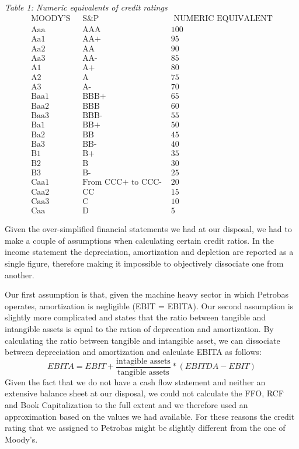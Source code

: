 \documentclass[
]{article}
\begin{document}
\emph{Table 1: Numeric equivalents of credit ratings} \[
\begin{array}{ccc}
\text { MOODY'S } & \text { S\&P } & \text { NUMERIC EQUIVALENT } \\
\hline \text { Aaa } & \text { AAA } & 100 \\
\text { Aa1 } & \text { AA+ } & 95 \\
\text { Aa2 } & \text { AA } & 90 \\
\text { Aa3 } & \text { AA- } & 85 \\
\text { A1 } & \text { A+ } & 80 \\
\text { A2 } & \text { A } & 75 \\
\text { A3 } & \text { A- } & 70 \\
\text { Baa1 } & \text { BBB+ } & 65 \\
\text { Baa2 } & \text { BBB } & 60 \\
\text { Baa3 } & \text { BBB- } & 55 \\
\text { Ba1 } & \text { BB+ } & 50 \\
\text { Ba2 } & \text { BB } & 45 \\
\text { Ba3 } & \text { BB- } & 40 \\
\text { B1 } & \text { B+ } & 35 \\
\text { B2 } & \text { B } & 30 \\
\text { B3 } & \text { B- } & 25 \\
\text { Caa1 } & \text { From CCC+ to CCC- } & 20 \\
\text { Caa2 } & \text { CC } & 15 \\
\text { Caa3 } & \text { C } & 10 \\
\text { Caa } & \text { D } & 5
\end{array}
\]

Given the over-simplified financial statements we had at our disposal,
we had to make a couple of assumptions when calculating certain credit
ratios. In the income statement the depreciation, amortization and
depletion are reported as a single figure, therefore making it
impossible to objectively dissociate one from another.

Our first assumption is that, given the machine heavy sector in which
Petrobas operates, amortization is negligible (EBIT = EBITA). Our second
assumption is slightly more complicated and states that the ratio
between tangible and intangible assets is equal to the ration of
deprecation and amortization. By calculating the ratio between tangible
and intangible asset, we can dissociate between depreciation and
amortization and calculate EBITA as follows: \[
EBITA = EBIT + \frac{\text{intagible assets}}{\text{tangible assets}}*(EBITDA-EBIT)
\] Given the fact that we do not have a cash flow statement and neither
an extensive balance sheet at our disposal, we could not calculate the
FFO, RCF and Book Capitalization to the full extent and we therefore
used an approximation based on the values we had available. For these
reasons the credit rating that we assigned to Petrobas might be slightly
different from the one of Moody's.
\end{document}
